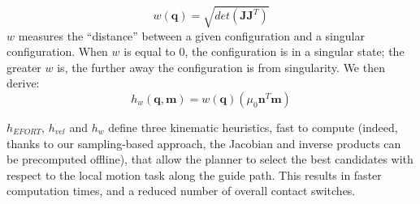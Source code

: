 \begin{equation*} \label{ellipsoid}
w(\mathbf{q}) = \sqrt{det(\mathbf{J}\mathbf{J}^T)}
\end{equation*}
$w$ measures the ``distance'' between a given configuration and a singular configuration. When $w$ is equal to 0, the configuration is in a singular state;
the greater $w$ is, the further away the configuration is from singularity.
We then derive:
\begin{equation}
h_{w}(\mathbf{q}, \mathbf{m}) = w(\mathbf{q})  (\mu_0 \mathbf{n}^T \mathbf{m})
\end{equation}

$h_{EFORT}$, $h_{vel}$ and $h_{w}$ define three kinematic heuristics, fast to compute (indeed, thanks to our sampling-based approach, the Jacobian and inverse products
can be precomputed offline), that allow the planner to select the best
candidates with respect to the local motion task along the guide path.
This results in faster computation times, and a reduced number of overall contact switches.



